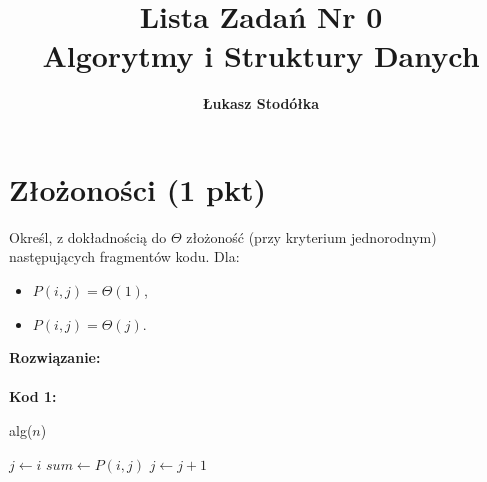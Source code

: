 \documentclass[12pt]{article}
\title{\textbf{\huge Lista Zadań Nr 0 \\ {\large Algorytmy i Struktury Danych}}}
\author{\textbf{\Large Łukasz Stodółka}}
\begin{document}
	\maketitle

	\section{Złożoności (1 pkt)}
	Określ, z dokładnością do $\Theta$ złożoność (przy kryterium jednorodnym) następujących
	fragmentów kodu. Dla:
	\begin{itemize}
		\item $P(i,j) = \Theta(1)$,

		\item $P(i,j) = \Theta(j)$.
	\end{itemize}
	\textcolor{tokyoNightGreen}{\textbf{\large Rozwiązanie:}} \\\\ \textbf{Kod 1:}

    \begin{algorithm}
        \caption{alg($n$)}
        \begin{algorithmic}[1]
            \State $j \gets i$
                \State $sum \gets P(i,j)$
                \State $j \gets j + 1$
            \EndWhile
        \EndFor
        \end{algorithmic}
    \end{algorithm}
\end{document}
